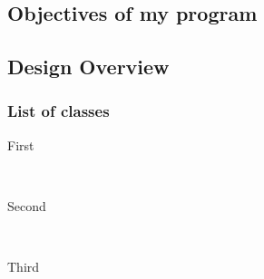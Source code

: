 \documentclass[12pt]{article} %
\begin{document}
\subsection{Objectives of my program} %



\subsection{Design Overview}
\subsubsection{List of classes}

\begin{description} %

\item[First] \hfill \\


\item[Second] \hfill \\


\item[Third] \hfill \\


\end{description} 


\newpage






\end{document}
